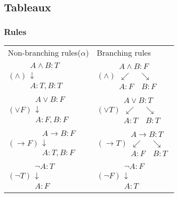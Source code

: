 \subsection{Tableaux}
\subsubsection{Rules}
	\begin{tabular}{m{3cm} m{3cm} }
	Non-branching rules($\alpha$)  & Branching rules\\
	$ (\land) \begin{matrix}
	A\land B:T\\
	\downarrow\\
	A:T,B:T
	\end{matrix} $
	&$ (\land)  \begin{matrix}
	A\land B:F\\
	\swarrow \quad \searrow\\
	A:F \quad B:F
	\end{matrix}$\\
	$ (\lor F) \begin{matrix}
	A\lor B:F\\
	\downarrow\\
	A:F,B:F
	\end{matrix} $ &
	$ (\lor T) \begin{matrix}
	A\lor B:T\\
	\swarrow \quad \searrow\\
	A:T\quad B:T
	\end{matrix} $ \\
		$ (\to F) \begin{matrix}
		A\to B:F\\
		\downarrow\\
		A:T,B:F
		\end{matrix} $ &
		$ (\to T) \begin{matrix}
		A\to B:T\\
		\swarrow \quad \searrow\\
		A:F\quad B:T
		\end{matrix} $ \\
		$ (\neg T) 
		\begin{matrix}
		\neg A:T\\
		\downarrow\\
		A:F
		\end{matrix} $ &
		$ (\neg F) 
		\begin{matrix}
		\neg A:F\\
		\downarrow\\
		A:T
		\end{matrix} $
		
		 
	\end{tabular}
	
